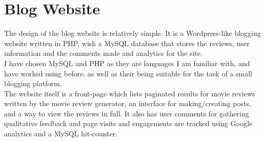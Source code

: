 \section{Blog Website}
The design of the blog website is relatively simple. It is a Wordpress-like blogging website written in PHP, wish a MySQL database that stores the reviews, user information and the comments made and analytics for the site.\\
I have chosen MySQL and PHP as they are languages I am familiar with, and have worked using before, as well as their being suitable for the task of a small blogging platform.\\
The website itself is a front-page which lists paginated results for movie reviews written by the movie review generator, an interface for making/creating posts, and a way to view the reviews in full. It also has user comments for gathering qualitative feedback and page visits and engagements are tracked using Google analytics and a MySQL hit-counter.\\
